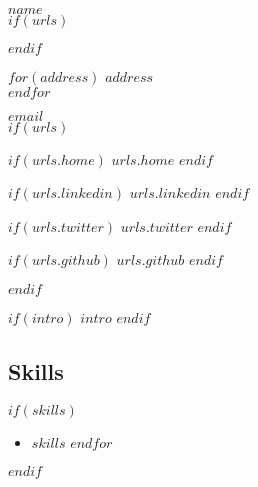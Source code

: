 \documentclass[$fontsize$, a4paper]{article}
\begin{document}
{\LARGE $name$}\\[.2cm]

$if(urls)$
\begin{multicols}{2}
$endif$

$for(address)$
$address$\\
$endfor$


\vspace{-10pt}

\href{mailto:$email$}{$email$}\\


$if(urls)$
\columnbreak

$if(urls.home)$
{\small \faHome \href{http://$urls.home$}{$urls.home$}}
$endif$

$if(urls.linkedin)$
{\small \faLinkedin \href{https://www.linkedin.com/in/$urls.linkedin$}{$urls.linkedin$}}
$endif$

$if(urls.twitter)$
{\small \faTwitter \href{https://twitter.com/$urls.twitter$}{$urls.twitter$}}
$endif$

$if(urls.github)$
{\small \faGithub \href{https://github.com/$urls.github$}{$urls.github$}}
$endif$

\end{multicols}
$endif$


\vspace{30pt}

$if(intro)$
$intro$
$endif$

\subsection*{Skills}
$if(skills)$
\begin{itemize}
    $for(skills)$
      \item $skills$
    $endfor$
\end{itemize}
$endif$


\vspace{25pt}
\end{document}
